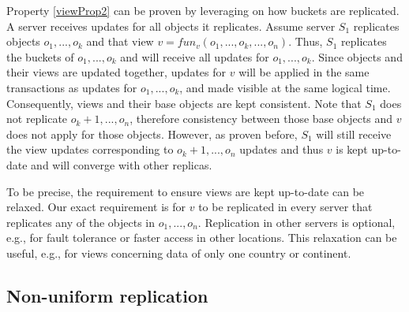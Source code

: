 \documentclass{vldb}
\begin{document}
Property \ref{viewProp2} can be proven by leveraging on how buckets are replicated.
A server receives updates for all objects it replicates.
Assume server $S_1$ replicates objects $o_1, ..., o_k$ and that view $v = fun_v(o_1, ..., o_k, ..., o_n)$.
Thus, $S_1$ replicates the buckets of $o_1, ..., o_k$ and will receive all updates for $o_1, ..., o_k$.
Since objects and their views are updated together, updates for $v$ will be applied in the same transactions as updates for $o_1, ..., o_k$, and made visible at the same logical time.
Consequently, views and their base objects are kept consistent.
Note that $S_1$ does not replicate $o_k+1, ..., o_n$, therefore consistency between those base objects and $v$ does not apply for those objects.
However, as proven before, $S_1$ will still receive the view updates corresponding to $o_k+1, ..., o_n$ updates and thus $v$ is kept up-to-date and will converge with other replicas. %

To be precise, the requirement to ensure views are kept up-to-date can be relaxed.
Our exact requirement is for $v$ to be replicated in every server that replicates any of the objects in $o_1, ..., o_n$.
Replication in other servers is optional, e.g., for fault tolerance or faster access in other locations.
This relaxation can be useful, e.g., for views concerning data of only one country or continent.





\subsection{Non-uniform replication}
\label{subsec:nonuniform}
\end{document}
